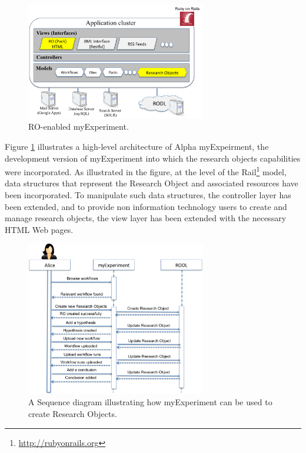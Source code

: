 \begin{figure}
\begin{center}
\includegraphics[width=0.7\textwidth]{Figures/myexperimentArchitecture.png}
\end{center}
\caption{RO-enabled myExperiment.}
\label{fig:myexperimentarchitecture}
\end{figure}

Figure \ref{fig:myexperimentarchitecture} illustrates a high-level architecture of Alpha myExpeirment, the development version of myExperiment into which the research objects capabilities were incorporated. As illustrated in the figure, at the level of the Rail\footnote{\url{http://rubyonrails.org}} model, data structures that represent the Research Object and associated resources have been incorporated. To manipulate such data structures, the controller layer has been extended, and to provide non information technology users to create and manage research objects, the view layer has been extended with the necessary HTML Web pages.


\begin{figure}
\begin{center}
\includegraphics[width=0.7\textwidth]{Figures/myexperimentInteractions.png}
\end{center}
\caption{A Sequence diagram illustrating how myExperiment can be used to create Research Objects.}
\label{fig:myexperimentinteractions}
\end{figure}

